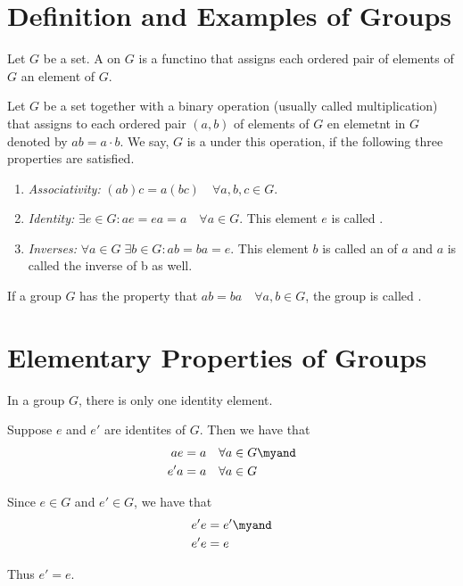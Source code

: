 \section{Definition and Examples of Groups}
\begin{mydef} 
  Let $G$ be a set. A  on $G$ is a functino that assigns each ordered pair of elements of $G$ an element of $G$.
\end{mydef}

\begin{mydef}[Group]
  Let $G$ be a set together with a binary operation (usually called multiplication) that assigns to each ordered pair $(a,b)$ of elements of $G$ en elemetnt in $G$ denoted by $ab = a \cdot b$. We say, $G$ is a  under this operation, if the following three properties are satisfied.
  \begin{enumerate}[label=(\roman*)]
    \item \emph{Associativity:} $(ab)c=a(bc) \quad \forall a,b,c \in G$.
    \item \emph{Identity:} $\exists e \in G: ae = ea = a \quad \forall a\in G$. This element $e$ is called .
    \item \emph{Inverses:} $\forall a \in G \; \exists b \in G: ab = ba = e$. This element $b$ is called an  of $a$ and $a$ is called the inverse of b as well.
  \end{enumerate}

  If a group $G$ has the property that $ab = ba \quad \forall a, b \in G$, the group is called .
\end{mydef}

\section{Elementary Properties of Groups}
\begin{thm}
  In a group $G$, there is only one identity element.
\end{thm}
\begin{prf}
  Suppose $e$ and $e'$ are identites of $G$. Then we have that
  \begin{equation}
    \begin{aligned}
      ae  &= a \quad \forall a \in G \myand \\
      e'a &= a \quad \forall a \in G
    \end{aligned}
  \end{equation}

  Since $e \in G$ and $e' \in G$, we have that
  \begin{equation}
    \begin{aligned}
      e'e  &= e' \myand \\
      e'e  &= e
    \end{aligned}
  \end{equation}

  Thus $e' = e$.
\end{prf}


